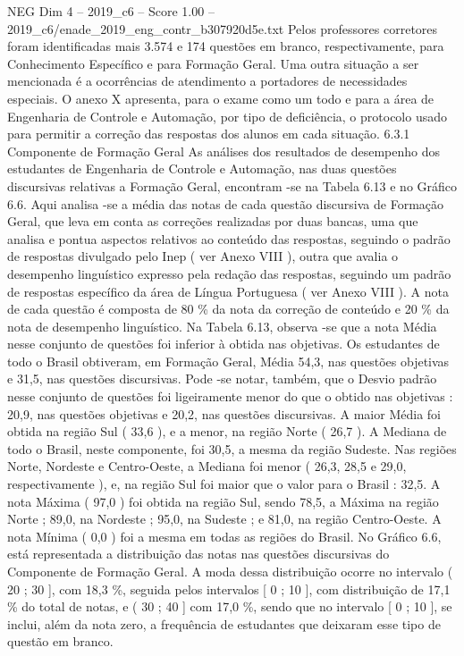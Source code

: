 \begin{textsample}{NEG Dim 4 – 2019\_c6 – Score 1.00 – 2019\_c6/enade\_2019\_eng\_contr\_b307920d5e.txt}
Pelos professores corretores foram identificadas mais 3.574 e 174 questões em branco, respectivamente, para Conhecimento Específico e para Formação Geral.
Uma outra situação a ser mencionada é a ocorrências de atendimento a portadores de necessidades especiais.
O anexo X apresenta, para o exame como um todo e para a área de Engenharia de Controle e Automação, por tipo de deficiência, o protocolo usado para permitir a correção das respostas dos alunos em cada situação. 6.3.1 Componente de Formação Geral As análises dos resultados de desempenho dos estudantes de Engenharia de Controle e Automação, nas duas questões discursivas relativas a Formação Geral, encontram -se na Tabela 6.13 e no Gráfico 6.6.
Aqui analisa -se a média das notas de cada questão discursiva de Formação Geral, que leva em conta as correções realizadas por duas bancas, uma que analisa e pontua aspectos relativos ao conteúdo das respostas, seguindo o padrão de respostas divulgado pelo Inep ( ver Anexo VIII ), outra que avalia o desempenho linguístico expresso pela redação das respostas, seguindo um padrão de respostas específico da área de Língua Portuguesa ( ver Anexo VIII ).
A nota de cada questão é composta de 80 \% da nota da correção de conteúdo e 20 \% da nota de desempenho linguístico.
Na Tabela 6.13, observa -se que a nota Média nesse conjunto de questões foi inferior à obtida nas objetivas.
Os estudantes de todo o Brasil obtiveram, em Formação Geral, Média 54,3, nas questões objetivas e 31,5, nas questões discursivas.
Pode -se notar, também, que o Desvio padrão nesse conjunto de questões foi ligeiramente menor do que o obtido nas objetivas : 20,9, nas questões objetivas e 20,2, nas questões discursivas.
A maior Média foi obtida na região Sul ( 33,6 ), e a menor, na região Norte ( 26,7 ).
A Mediana de todo o Brasil, neste componente, foi 30,5, a mesma da região Sudeste.
Nas regiões Norte, Nordeste e Centro-Oeste, a Mediana foi menor ( 26,3, 28,5 e 29,0, respectivamente ), e, na região Sul foi maior que o valor para o Brasil : 32,5.
A nota Máxima ( 97,0 ) foi obtida na região Sul, sendo 78,5, a Máxima na região Norte ; 89,0, na Nordeste ; 95,0, na Sudeste ; e 81,0, na região Centro-Oeste.
A nota Mínima ( 0,0 ) foi a mesma em todas as regiões do Brasil.
No Gráfico 6.6, está representada a distribuição das notas nas questões discursivas do Componente de Formação Geral.
A moda dessa distribuição ocorre no intervalo ( 20 ; 30 ], com 18,3 \%, seguida pelos intervalos [ 0 ; 10 ], com distribuição de 17,1 \% do total de notas, e ( 30 ; 40 ] com 17,0 \%, sendo que no intervalo [ 0 ; 10 ], se inclui, além da nota zero, a frequência de estudantes que deixaram esse tipo de questão em branco.

\end{textsample}
